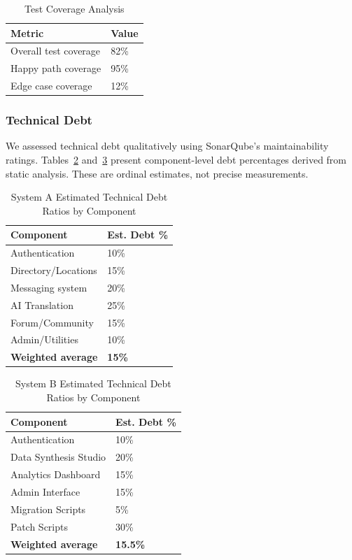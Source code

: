 \documentclass[sigconf]{acmart}
\begin{document}
\begin{table}[htbp]
\caption{Test Coverage Analysis}
\label{tab:coverage}
\centering
\begin{tabular}{@{}p{}p{}@{}}
\toprule
\textbf{Metric} & \textbf{Value} \\
\midrule
Overall test coverage & 82\% \\
Happy path coverage & 95\% \\
Edge case coverage & 12\% \\
\bottomrule
\end{tabular}
\end{table}

\subsubsection{Technical Debt}

We assessed technical debt qualitatively using SonarQube's maintainability ratings. Tables~\ref{tab:systema-debt} and~\ref{tab:systemb-debt} present component-level debt percentages derived from static analysis. These are ordinal estimates, not precise measurements.

\begin{table}[htbp]
\caption{System A Estimated Technical Debt Ratios by Component}
\label{tab:systema-debt}
\centering
\begin{tabular}{@{}p{}p{}@{}}
\toprule
\textbf{Component} & \textbf{Est. Debt \%} \\
\midrule
Authentication & 10\% \\
Directory/Locations & 15\% \\
Messaging system & 20\% \\
AI Translation & 25\% \\
Forum/Community & 15\% \\
Admin/Utilities & 10\% \\
\textbf{Weighted average} & \textbf{15\%} \\
\bottomrule
\end{tabular}
\end{table}

\begin{table}[htbp]
\caption{System B Estimated Technical Debt Ratios by Component}
\label{tab:systemb-debt}
\centering
\begin{tabular}{@{}p{}p{}@{}}
\toprule
\textbf{Component} & \textbf{Est. Debt \%} \\
\midrule
Authentication & 10\% \\
Data Synthesis Studio & 20\% \\
Analytics Dashboard & 15\% \\
Admin Interface & 15\% \\
Migration Scripts & 5\% \\
Patch Scripts & 30\% \\
\textbf{Weighted average} & \textbf{15.5\%} \\
\bottomrule
\end{tabular}
\end{table}
\end{document}
